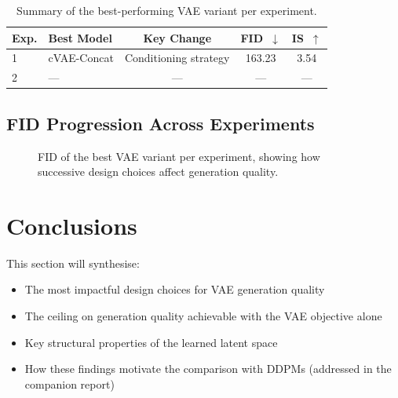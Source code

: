 \documentclass[12pt, a4paper]{article}
\begin{document}
\begin{table}[H]
    \centering
    \caption{Summary of the best-performing VAE variant per experiment.}
    \label{tab:summary}
    \begin{tabularx}{\linewidth}{lXccc}
        \toprule
        \textbf{Exp.} & \textbf{Best Model}
                      & \textbf{Key Change}
                      & \textbf{FID}~$\downarrow$
                      & \textbf{IS}~$\uparrow$ \\
        \midrule
        1 & cVAE-Concat & Conditioning strategy & 163.23 & 3.54 \\
        2 & — & — & — & — \\
        \bottomrule
    \end{tabularx}
\end{table}

\subsection{FID Progression Across Experiments}

\begin{figure}[H]
    \centering
    \caption{FID of the best VAE variant per experiment, showing how
             successive design choices affect generation quality.}
    \label{fig:fid-prog}
\end{figure}

\section{Conclusions}
\label{sec:conclusions}

\begin{tcolorbox}[colback=yellow!8, colframe=orange!60!black,
                  fonttitle=\bfseries, title={Content placeholder}]
This section will synthesise:
\begin{itemize}
    \item The most impactful design choices for VAE generation quality
    \item The ceiling on generation quality achievable with the VAE
          objective alone
    \item Key structural properties of the learned latent space
    \item How these findings motivate the comparison with DDPMs
          (addressed in the companion report)
\end{itemize}
\end{tcolorbox}
\end{document}
